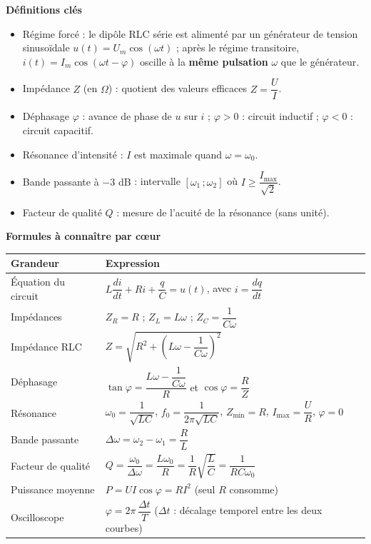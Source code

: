 \documentclass[11pt]{article}
\newcommand{\cle}[1]{{\popxbold\color{popdark}#1}}
\begin{document}
\begin{bilan}
\textbf{Définitions clés}
\begin{itemize}
  \item \cle{Régime forcé} : le dipôle RLC série est alimenté par un générateur de tension sinusoïdale $u(t)=U_m\cos(\omega t)$ ; après le régime transitoire, $i(t)=I_m\cos(\omega t-\varphi)$ oscille à la \textbf{même pulsation} $\omega$ que le générateur.
  \item \cle{Impédance} $Z$ (en $\Omega$) : quotient des valeurs efficaces $Z=\dfrac{U}{I}$.
  \item \cle{Déphasage} $\varphi$ : avance de phase de $u$ sur $i$ ; $\varphi>0$ : circuit inductif ; $\varphi<0$ : circuit capacitif.
  \item \cle{Résonance d'intensité} : $I$ est maximale quand $\omega=\omega_0$.
  \item \cle{Bande passante à $-3$ dB} : intervalle $[\omega_1\,;\omega_2]$ où $I\geq \dfrac{I_{\max}}{\sqrt{2}}$.
  \item \cle{Facteur de qualité} $Q$ : mesure de l'acuité de la résonance (sans unité).
\end{itemize}

\textbf{Formules à connaître par cœur}
\begin{center}
\begin{tabularx}{\linewidth}{|l|X|}
\hline
\rowcolor{popblueL} \textbf{Grandeur} & \textbf{Expression} \\
\hline
Équation du circuit & $L\dfrac{di}{dt}+Ri+\dfrac{q}{C}=u(t)$, avec $i=\dfrac{dq}{dt}$ \\
\hline
Impédances & $Z_R=R$ ; \quad $Z_L=L\omega$ ; \quad $Z_C=\dfrac{1}{C\omega}$ \\
\hline
Impédance RLC & $Z=\sqrt{R^2+\left(L\omega-\dfrac{1}{C\omega}\right)^2}$ \\
\hline
Déphasage & $\tan\varphi=\dfrac{L\omega-\dfrac{1}{C\omega}}{R}$ \quad et \quad $\cos\varphi=\dfrac{R}{Z}$ \\
\hline
Résonance & $\omega_0=\dfrac{1}{\sqrt{LC}}$, \quad $f_0=\dfrac{1}{2\pi\sqrt{LC}}$, \quad $Z_{\min}=R$, \quad $I_{\max}=\dfrac{U}{R}$, \quad $\varphi=0$ \\
\hline
Bande passante & $\Delta\omega=\omega_2-\omega_1=\dfrac{R}{L}$ \\
\hline
Facteur de qualité & $Q=\dfrac{\omega_0}{\Delta\omega}=\dfrac{L\omega_0}{R}=\dfrac{1}{R}\sqrt{\dfrac{L}{C}}=\dfrac{1}{RC\omega_0}$ \\
\hline
Puissance moyenne & $P=UI\cos\varphi=RI^2$ \quad (seul $R$ consomme) \\
\hline
Oscilloscope & $\varphi=2\pi\,\dfrac{\Delta t}{T}$ \quad ($\Delta t$ : décalage temporel entre les deux courbes) \\
\hline
\end{tabularx}
\end{center}


\end{bilan}
\end{document}
